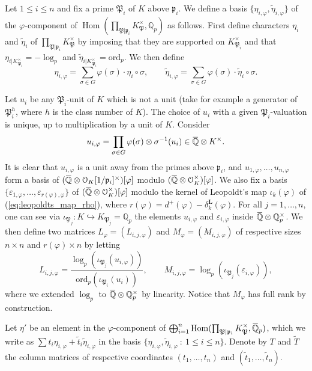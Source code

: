 \documentclass[12pt]{amsart}
\newcommand{\Q}{\mathbb{Q}}
\newcommand\bQ{\mathbb{Q}}
\newcommand\Qp{{\mathbb{Q}_p}}
\newcommand\cO{\mathcal{O}}
\newcommand\gp{\mathfrak{p}}
\newcommand\gP{\mathfrak{P}}
\newcommand{\ob}[1]{\mkern 1.5mu\overline{\mkern-1.5mu#1\mkern-1.5mu}\mkern 1.5mu}
\newcommand{\ord}{\mathrm{ord}}
\DeclareMathOperator{\Hom}{Hom}
\theoremstyle{defstyle}
\theoremstyle{thmstyle}
\begin{document}
	Let $1\leq i \leq n$ and fix a prime $\gP_i$ of $K$ above $\gp_i$. We define a basis $\{\eta_{i,\varphi},\tilde{\eta}_{i,\varphi}\}$ of the $\varphi$-component of $\Hom(\prod_{\gP|\gp_i} K^\times_{\gP},\Qp)$ as follows. First define characters $\eta_i$ and $\tilde{\eta}_i$ of $\prod_{\gP|\gp_i} K^\times_{\gP}$ by imposing that they are supported on $K_{\gP_i}^\times$ and that $\eta_{i|K_{\gP_i}^\times}=-\log_p$ and $\tilde{\eta}_{i|K_{\gP_i}^\times}=\ord_p$. We then define 
	\[\eta_{i,\varphi} = \sum_{\sigma \in G} \varphi(\sigma) \cdot \eta_i \circ \sigma, \qquad \tilde{\eta}_{i,\varphi} = \sum_{\sigma \in G} \varphi(\sigma) \cdot \tilde{\eta}_i \circ \sigma. \]
	
	Let $u_i$ be any $\gP_i$-unit of $K$ which is not a unit (take for example a generator of $\gP_i^h$, where $h$ is the class number of $K$). The choice of $u_i$ with a given $\gP_i$-valuation is unique, up to multiplication by a unit of $K$. Consider 
	$$u_{i,\varphi}= \prod_{\sigma\in G} \varphi(\sigma) \otimes \sigma^{-1}(u_i) \in \ob{\bQ} \otimes K^\times.$$
	It is clear that $u_{i,\varphi}$ is a unit away from the primes above $\gp_i$, and $u_{1,\varphi},\ldots,u_{n,\varphi}$ form a basis of $(\ob{\Q} \otimes \cO_K[1/\gp_i]^\times)[\varphi]$ modulo $(\ob{\Q} \otimes \cO_K^\times)[\varphi]$. We also fix a basis $\{\varepsilon_{1,\varphi},\ldots,\varepsilon_{r(\varphi),\varphi}\}$ of $(\ob{\Q} \otimes \cO_K^\times)[\varphi]$ modulo the kernel of Leopoldt's map $\iota_k(\varphi)$ of (\ref{eq:leopoldts_map_rho}), where $r(\varphi)=d^+(\varphi)-\delta^\textbf{L}_k(\varphi)$. For all $j=1,\ldots,n$, one can see via $\iota_{\gP_j} \colon K \hookrightarrow K_{\gP_j}=\Q_p$ the elements $u_{i,\varphi}$ and $\varepsilon_{i,\varphi}$ inside $\ob{\Q} \otimes \Q_p^\times$. We then define two matrices $L_\varphi=(L_{i,j,\varphi})$ and $M_\varphi=(M_{i,j,\varphi})$ of respective sizes $n\times n$ and $r(\varphi) \times n$ by letting 
\begin{equation}\label{eq:def_matrices_logs}
		L_{i,j,\varphi} = \dfrac{\log_p(\iota_{\gP_j}(u_{i,\varphi}))}{\ord_p(\iota_{\gP_i}(u_i))}, \qquad M_{i,j,\varphi} = {\log_p(\iota_{\gP_j}(\varepsilon_{i,\varphi}))},
\end{equation}
	where we extended $\log_p$ to $\ob{\Q} \otimes \Q_p^\times$ by linearity. Notice that $M_\varphi$ has full rank by construction. 
	
	Let $\eta'$ be an element in the $\varphi$-component of $\bigoplus_{i=1}^n  \Hom(\prod_{\gP|\gp_i} K^\times_{\gP},\ob{\bQ}_p)$, which we write as $\sum t_i\eta_{i,\varphi} + \tilde{t}_i \tilde{\eta}_{i,\varphi}$ in the basis $\{\eta_{i,\varphi}, \tilde{\eta}_{i,\varphi} \ \colon\ 1\leq i \leq n\}$. Denote by $T$ and $\tilde{T}$ the column matrices of respective coordinates $(t_1,\ldots,t_n)$ and $(\tilde{t}_1,\ldots,\tilde{t}_n)$.
	
\end{document}
